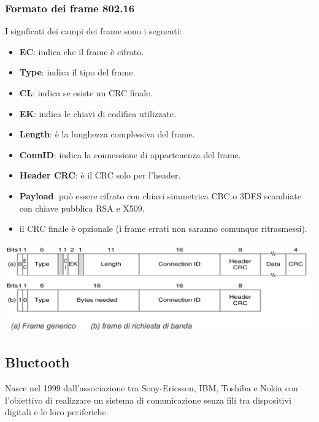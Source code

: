         \subsubsection{Formato dei frame 802.16}
            I signficati dei campi dei frame sono i seguenti:
            \begin{itemize}
                \item \textbf{EC}: indica che il frame è cifrato.
                \item \textbf{Type}: indica il tipo del frame.
                \item \textbf{CL}: indica se esiste un CRC finale.
                \item \textbf{EK}: indica le chiavi di codifica utilizzate.
                \item \textbf{Length}: è la lunghezza complessiva del frame.
                \item \textbf{ConnID}: indica la connessione di appartenenza del frame.
                \item \textbf{Header CRC}: è il CRC solo per l'header.
                \item \textbf{Payload}: può essere cifrato con chiavi simmetrica CBC o 3DES scambiate con chiave pubblica RSA e X509.
                \item il CRC finale è opzionale (i frame errati non saranno comunque ritrasmessi).
            \end{itemize}

            \begin{center}
                \includegraphics[scale=0.31]{chapters/3/assets/schema_za.png}
            \end{center}

    \subsection{Bluetooth}
        Nasce nel 1999 dall'associazione tra Sony-Ericsson, IBM, Toshiba e Nokia con l'obiettivo di realizzare un sistema di comunicazione senza fili tra dispositivi digitali e le loro periferiche.
        
